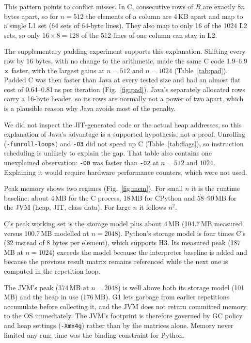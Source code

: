 \documentclass[11pt,a4paper]{article}
\newcommand{\concept}[1]{\par\addvspace{8pt}\Needspace{5\baselineskip}%
  \noindent{\color{accent}\bfseries\boldmath #1}\par\nopagebreak\vspace{2pt}}
\begin{document}
This pattern points to conflict misses. In C, consecutive rows of $B$ are exactly $8n$ bytes apart, so
for $n=512$ the elements of a column are 4\,KB apart and map to a single L1 set (64 sets of 64-byte
lines). They also map to only 16 of the 1024 L2 sets, so only $16\times8=128$ of the 512 lines of
one column can stay in L2.

The supplementary padding experiment supports this explanation. Shifting every row by 16 bytes, with
no change to the arithmetic, made the same C code 1.9--6.9$\times$ faster, with the largest gains at
$n=512$ and $n=1024$ (Table~\ref{tab:pad}). Padded C was then faster than Java at every tested size and
had an almost flat cost of 0.64--0.81\,ns per iteration (Fig.~\ref{fig:pad}). Java's separately
allocated rows carry a 16-byte header, so its rows are normally not a power of two apart, which is a
plausible reason why Java avoids most of the penalty.

We did not inspect the JIT-generated code or the actual heap addresses, so this explanation of
Java's advantage is a supported hypothesis, not a proof. Unrolling (\texttt{-funroll-loops}) and
\texttt{-O3} did not speed up C (Table~\ref{tab:flags}), so instruction scheduling is unlikely to
explain the gap. That table also contains one unexplained observation: \texttt{-O0} was faster than
\texttt{-O2} at $n=512$ and $1024$. Explaining it would require hardware performance counters,
which were not used.

\concept{Memory (H3)}
Peak memory shows two regimes (Fig.~\ref{fig:mem}). For small $n$ it is the
runtime baseline: about 4\,MB for the C process, 18\,MB for CPython and 58--90\,MB for the JVM (heap,
JIT, class data). For large $n$ it follows $n^2$.

C's peak working set is the storage model plus about 4\,MB (104.7\,MB measured versus 100.7\,MB
modelled at $n=2048$). Python's storage model is four times C's (32 instead of 8 bytes per element),
which supports H3. Its measured peak (187\,MB at $n=1024$) exceeds the model because the interpreter
baseline is added and because the previous result matrix remains referenced while the next one is
computed in the repetition loop.

The JVM's peak (374\,MB at $n=2048$) is well above both its storage model (101\,MB) and the heap in use
(176\,MB). G1 lets garbage from earlier repetitions accumulate before collecting it, and the JVM does
not return committed memory to the OS immediately. The JVM's footprint is therefore governed by GC
policy and heap settings (\texttt{-Xmx4g}) rather than by the matrices alone. Memory never limited
any run; time was the binding constraint for Python.
\end{document}
